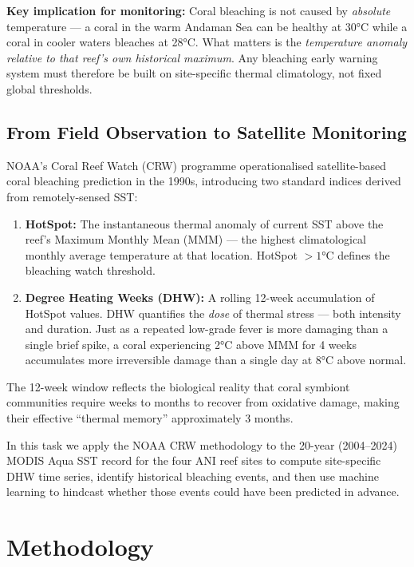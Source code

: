 \documentclass[12pt,a4paper]{report}
\begin{document}
\textbf{Key implication for monitoring:} Coral bleaching is not caused by
\textit{absolute} temperature --- a coral in the warm Andaman Sea can be healthy at
30°C while a coral in cooler waters bleaches at 28°C. What matters is the
\textit{temperature anomaly relative to that reef's own historical maximum}.
Any bleaching early warning system must therefore be built on site-specific thermal
climatology, not fixed global thresholds.

\subsection{From Field Observation to Satellite Monitoring}

NOAA's Coral Reef Watch (CRW) programme operationalised satellite-based coral
bleaching prediction in the 1990s, introducing two standard indices derived from
remotely-sensed SST:

\begin{enumerate}[leftmargin=*, nosep]
  \item \textbf{HotSpot:} The instantaneous thermal anomaly of current SST above the
  reef's Maximum Monthly Mean (MMM) --- the highest climatological monthly average
  temperature at that location. HotSpot $> 1$°C defines the bleaching watch threshold.

  \item \textbf{Degree Heating Weeks (DHW):} A rolling 12-week accumulation of
  HotSpot values. DHW quantifies the \textit{dose} of thermal stress --- both
  intensity and duration. Just as a repeated low-grade fever is more damaging than
  a single brief spike, a coral experiencing 2°C above MMM for 4 weeks accumulates
  more irreversible damage than a single day at 8°C above normal.
\end{enumerate}

The 12-week window reflects the biological reality that coral symbiont communities
require weeks to months to recover from oxidative damage, making their effective
``thermal memory'' approximately 3 months.

In this task we apply the NOAA CRW methodology to the 20-year (2004--2024) MODIS Aqua
SST record for the four ANI reef sites to compute site-specific DHW time series,
identify historical bleaching events, and then use machine learning to hindcast
whether those events could have been predicted in advance.

\section{Methodology}
\label{sec:task2_methods}
\end{document}
